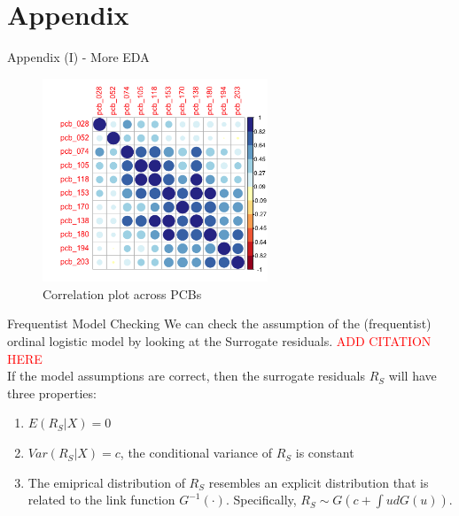 \documentclass{beamer}\usepackage[]{graphicx}\usepackage[]{color}
\begin{document}
\section{Appendix}
\begin{frame}{Appendix (I) - More EDA}
\begin{figure}
  \centering
  \includegraphics[width=0.6\textwidth]{corrplot_PCB.png}
\caption{Correlation plot across PCBs}
\label{fig:corrPCB}
\end{figure}
\end{frame}
\begin{frame}{Frequentist Model Checking}
We can check the assumption of the (frequentist) ordinal logistic model by looking at the Surrogate residuals. \textcolor{red}{ADD CITATION HERE}\\
\medskip
If the model assumptions are correct, then the surrogate residuals $R_S$ will have three properties:
\begin{enumerate}
 \item $E(R_S|X)=0$
 \item $Var(R_S|X)=c$, the conditional variance of $R_S$ is constant
 \item The emiprical distribution of $R_S$ resembles an explicit distribution that is related to the link function $G^{-1}(\cdot)$. Specifically, $R_S\sim G(c+\int ud G(u))$.
\end{enumerate}
\end{frame}
\end{document}
